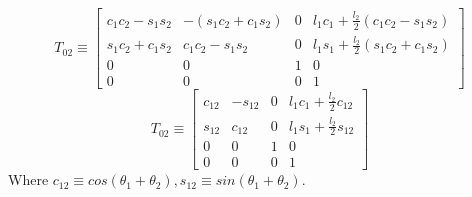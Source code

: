 \documentclass[12pt]{article}
\begin{document}
\[
  T_{02} \equiv
  \begin{bmatrix} c_1c_2 - s_1s_2 & -(s_1c_2 + c_1s_2) & 0 & l_1c_1 + \frac{l_2}{2}(c_1c_2 - s_1s_2) \\ s_1c_2 + c_1s_2 & c_1c_2 - s_1s_2 & 0 & l_1s_1 + \frac{l_2}{2}(s_1c_2 + c_1s_2) \\ 0 & 0 & 1 & 0 \\ 0 & 0 & 0 & 1 \end{bmatrix}
\]
\[
  T_{02} \equiv
  \begin{bmatrix} c_{12} & -s_{12} & 0 & l_1c_1 + \frac{l_2}{2}c_{12} \\ s_{12} & c_{12} & 0 & l_1s_1 + \frac{l_2}{2}s_{12} \\ 0 & 0 & 1 & 0 \\ 0 & 0 & 0 & 1 \end{bmatrix}
\]
Where $c_{12} \equiv cos(\theta_1 + \theta_2), s_{12} \equiv sin(\theta_1 + \theta_2)$.
\end{document}
